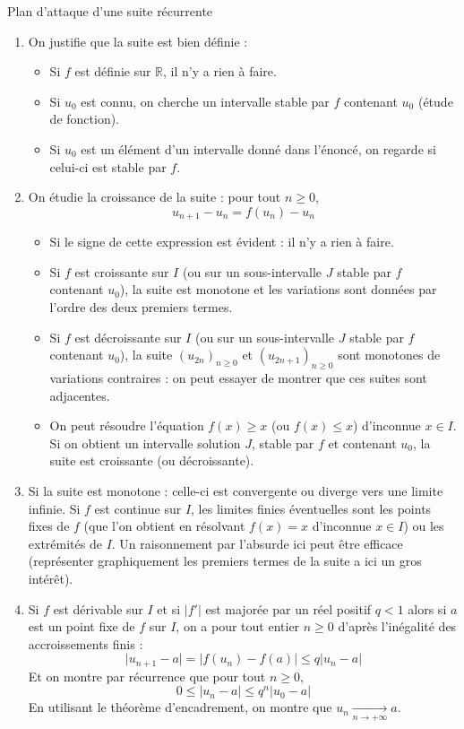 \documentclass[french,11pt,twoside]{VcCours}
\begin{document}
\newpage
\begin{Methode}{Plan d'attaque d'une suite récurrente}
\begin{enumerate}
\item On justifie que la suite est bien définie :
\begin{itemize}
\item Si $f$ est définie sur $\mathbb{R}$, il n'y a rien à faire.
\item Si $u_0$ est connu, on cherche un intervalle stable par $f$ contenant $u_0$ (étude de fonction).
\item Si $u_0$ est un élément d'un intervalle donné dans l'énoncé, on regarde si celui-ci est stable par $f$.
\end{itemize}
\item On étudie la croissance de la suite : pour tout $n \geq 0$, 
$$ u_{n+1}-u_n = f(u_n)-u_n$$
\begin{itemize}
\item Si le signe de cette expression est évident : il n'y a rien à faire.
\item Si $f$ est croissante sur $I$ (ou sur un sous-intervalle $J$ stable par $f$ contenant $u_0$), la suite est monotone et les variations sont données par l'ordre des deux premiers termes.
\item Si $f$ est décroissante sur $I$ (ou sur un sous-intervalle $J$ stable par $f$ contenant $u_0$), la suite $(u_{2n})_{n \geq 0}$ et $(u_{2n+1})_{n \geq 0}$ sont monotones de variations contraires : on peut essayer de montrer que ces suites sont adjacentes.
\item On peut résoudre l'équation $f(x) \geq x$ (ou $f(x) \leq x$) d'inconnue $x \in I$. Si on obtient un intervalle solution $J$, stable par $f$ et contenant $u_0$, la suite est croissante (ou décroissante).
\end{itemize}
\item Si la suite est monotone : celle-ci est convergente ou diverge vers une limite infinie. Si $f$ est continue sur $I$, les limites finies éventuelles sont les points fixes de $f$ (que l'on obtient en résolvant $f(x)=x$ d'inconnue $x \in I$) ou les extrémités de $I$. Un raisonnement par l'absurde ici peut être efficace (représenter graphiquement les premiers termes de la suite a ici un gros intérêt).
\item Si $f$ est dérivable sur $I$ et si $\vert f' \vert$ est majorée par un réel positif $q<1$ alors si $a$ est un point fixe de $f$ sur $I$, on a pour tout entier $n \geq 0$ d'après l'inégalité des accroissements finis :
$$ \vert u_{n+1}- a \vert = \vert f(u_n) - f(a) \vert \leq q \vert u_n -a \vert$$
Et on montre par récurrence que pour tout $n \geq 0$,
$$ 0 \leq \vert u_n - a \vert \leq q^n \vert u_0- a \vert $$
En utilisant le théorème d'encadrement, on montre que $u_n \underset{n \rightarrow + \infty}{\longrightarrow} a$.
\end{enumerate}
\end{Methode} 
 
\end{document}
